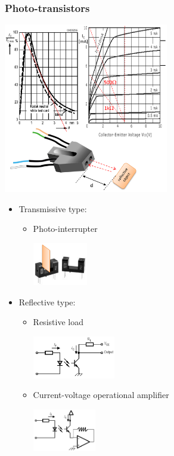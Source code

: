 \documentclass[11pt]{article}
\begin{document}
\subsubsection{Photo-transistors}
\label{sec:org196b2bd}
\begin{center}
\includegraphics[height=20em]{./images/photo-transistor-graphs-and-image.png}
\end{center}
\begin{itemize}
\item Transmissive type:
\begin{itemize}
\item Photo-interrupter
\begin{center}
\includegraphics[height=5em]{./images/photo-interrupter.png}
\end{center}
\end{itemize}
\item Reflective type:
\begin{itemize}
\item Resistive load
\begin{center}
\includegraphics[height=5em]{./images/reflective-resistive-load-circuit.png}
\end{center}
\item Current-voltage operational amplifier
\begin{center}
\includegraphics[height=5em]{./images/current-voltage-op-amp-circuit.png}
\end{center}
\end{itemize}
\end{itemize}
\end{document}
